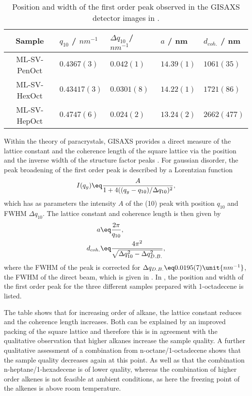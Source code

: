 \documentclass[\main/dresen_thesis.tex]{subfiles}
\begin{document}
  \begin{table}[tb]
    \centering
    \caption{\label{tab:monolayers:solventProperties:GisaxsLatticeParams}Position and width of the first order peak observed in the GISAXS detector images in .}
    \begin{tabular}{ c || l | l || l | l }
      Sample  & $q_{10}$ / $\unit{nm^{-1}}$ & $\Delta q_{10}$ / $nm^{-1}$ & $a$ / nm & $d_{coh.}$ / nm \\
      \hline
      ML-SV-PenOct
        & $0.4367(3)$
        & $0.042(1)$
        & $14.39(1)$
        & $1061(35)$\\
      ML-SV-HexOct
        & $0.43417(3)$
        & $0.0301(8)$
        & $14.22(1)$
        & $1721(86)$\\
      ML-SV-HepOct
        & $0.4747(6)$
        & $0.024(2)$
        & $13.24(2)$
        & $2662(477)$\\
      \hline
    \end{tabular}
  \end{table}

  Within the theory of paracrystals, GISAXS provides a direct measure of the lattice constant and the coherence length of the square lattice via the position and the inverse width of the structure factor peaks \cite{Renaud_2009_Probi}.
  For gaussian disorder, the peak broadening of the first order peak is described by a Lorentzian function
  \begin{align}
    I(q_y) \eq \frac{A} {1 + 4((q_y - q_{10})/\Delta q_{10})^2},
  \end{align}
  which has as parameters the intensity $A$ of the (10) peak with position $q_{10}$ and FWHM $\Delta q_{10}$.
  The lattice constant and coherence length is then given by
  \begin{align}
    a &\eq \frac{2 \pi}{q_{10}}, \\
    d_{coh.} &\eq \frac{4 \pi^2}{\sqrt{ \Delta q_{10}^2 - \Delta q_{D.B.}^2 }},
  \end{align}
  where the FWHM of the peak is corrected for $\Delta q_{D.B.} \eq 0.0195(7) \unit{nm^{-1}}$, the FWHM of the direct beam, which is given in . In , the position and width of the first order peak for the three different samples prepared with 1-octadecene is listed.

  The table shows that for increasing order of alkane, the lattice constant reduces and the coherence length increases.
  Both can be explained by an improved packing of the square lattice and therefore this is in agreement with the qualitative observation that higher alkanes increase the sample quality.
  A further qualitative assessment of a combination from n-octane/1-octadecene shows that the sample quality decreases again at this point.
  As well as that the combination n-heptane/1-hexadecene is of lower quality, whereas the combination of higher order alkenes is not feasible at ambient conditions, as here the freezing point of the alkenes is above room temperature.
\end{document}
